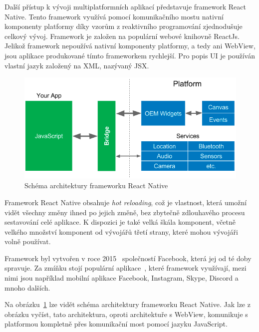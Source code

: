 Další přístup k vývoji multiplatformních aplikací představuje framework
React Native.
Tento framework využívá pomocí komunikačního mostu nativní komponenty platformy
díky vzorům z reaktivního programování zjednodušuje celkový vývoj.
\cite{hackernoon_flutter}
Framework je založen na populární webové knihovně ReactJs.
\cite{dashmagazine_mobile_frameworks}
Jelikož framework nepoužívá nativní komponenty platformy,
a tedy ani WebView,
jsou aplikace produkované tímto frameworkem rychlejší.
Pro popis UI je používán vlastní jazyk založený na XML, nazývaný JSX.

\begin{figure}[ht!]
    \centering
    \includegraphics[width=\linewidth]{assets/technology-research/framework/react_native.png}
    \caption{Schéma architektury frameworku React Native
    ~\cite{hackernoon_flutter}}
    \label{fig:framework_react_native}
\end{figure}

Framework React Native obsahuje \emph{hot reloading},
což je vlastnost,
která umožní vidět všechny změny ihned po jejich změně,
bez zbytečně zdlouhavého procesu sestavování celé aplikace.
K dispozici je také velká škála komponent,
včetně velkého množství komponent od vývojářů třetí strany, 
které mohou vývojáři volně používat.
\cite{dashmagazine_mobile_frameworks}

Framework byl vytvořen v roce 2015~\cite{hackernoon_flutter}
společností Facebook,
která jej od té doby spravuje.
Za zmíňku stojí populární aplikace~\cite{react_native},
které framework využívají,
mezi nimi jsou například mobilní aplikace Facebook, Instagram, Skype, Discord
a mnoho dalších.

Na obrázku~\ref{fig:framework_react_native} lze vidět schéma architektury
frameworku React Native.
Jak lze z obrázku vyčíst,
tato architektura,
oproti architektuře s WebView,
komunikuje s platformou kompletně přes komunikační most pomocí jazyku
JavaScript.

